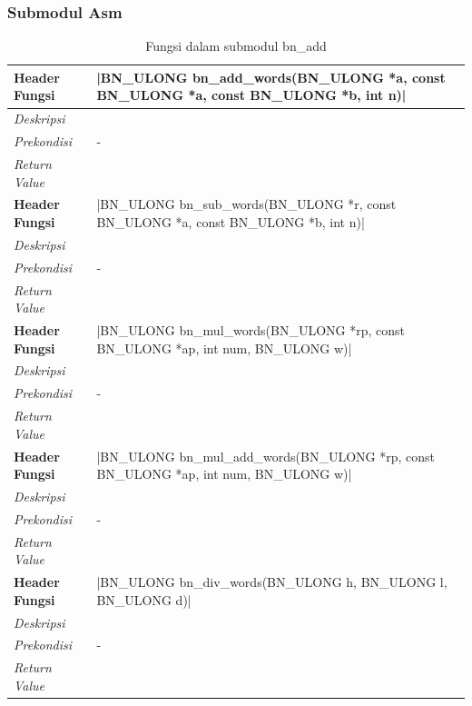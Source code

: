 \subsubsection{Submodul Asm}
\begin{table}[h]
  \caption{Fungsi dalam submodul bn\_add}
  \begin{tabular}{R{2.5cm}L{10.5cm}}
\toprule
\textbf{Header Fungsi} & |BN_ULONG bn_add_words(BN_ULONG *a, const BN_ULONG *a, const BN_ULONG *b, int n)|    \\ \midrule
\textit{Deskripsi}     &   \\
\textit{Prekondisi}    &  -\\
\textit{Return Value}  &
 \\ \bottomrule
\textbf{Header Fungsi} & |BN_ULONG bn_sub_words(BN_ULONG *r, const BN_ULONG *a, const BN_ULONG *b, int n)|    \\ \midrule
\textit{Deskripsi}     &   \\
\textit{Prekondisi}    &  -\\
\textit{Return Value}  &
 \\ \bottomrule
\textbf{Header Fungsi} & |BN_ULONG bn_mul_words(BN_ULONG *rp, const BN_ULONG *ap, int num, BN_ULONG w)|    \\ \midrule
\textit{Deskripsi}     &   \\
\textit{Prekondisi}    &  -\\
\textit{Return Value}  &
 \\ \bottomrule
\textbf{Header Fungsi} & |BN_ULONG bn_mul_add_words(BN_ULONG *rp, const BN_ULONG *ap, int num, BN_ULONG w)|    \\ \midrule
\textit{Deskripsi}     &   \\
\textit{Prekondisi}    &  -\\
\textit{Return Value}  &
 \\ \bottomrule
\textbf{Header Fungsi} & |BN_ULONG bn_div_words(BN_ULONG h, BN_ULONG l, BN_ULONG d)|    \\ \midrule
\textit{Deskripsi}     &   \\
\textit{Prekondisi}    &  -\\
\textit{Return Value}  &
 \\ \bottomrule
\end{tabular}

\end{table}
